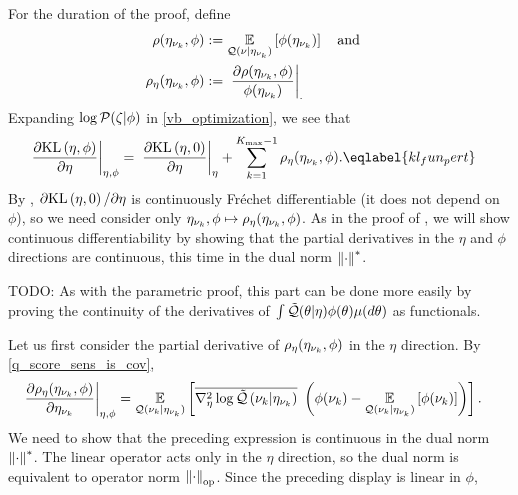 For the duration of the proof, define
%
\begin{align*}
%
\rho(\etanuk, \phi) :={}&
    \expect{\q(\nu \vert \etanuk)}{\phi(\etanuk)}
\mathand\\
\rho_\eta(\etanuk, \phi) :={}&
    \fracat{\partial \rho(\etanuk, \phi)}{\phi(\etanuk)}.
%
\end{align*}
%
Expanding $\log \mathcal{P}(\zeta \vert \phi)$ in \eqref{vb_optimization}, we see that
%
\begin{align}
\fracat{\partial \KL{\eta, \phi}}{\partial \eta}{\eta, \phi}
 ={}&
    \fracat{\partial \KL{\eta, \phiz}}{\partial \eta}{\eta} +
    \sumkm \rho_\eta(\etanuk, \phi). \eqlabel{kl_fun_pert}
%
\end{align}
%
By , $\partial \mathrm{KL}\left(\eta, 0\right) / \partial \eta$ is
continuously Fr{\'e}chet differentiable (it does not depend on $\phi$), so we
need consider only $\eta_{\nu_{k}}, \phi \mapsto \rho_\eta(\eta_{\nu_{k}}, \phi)$.  As
in the proof of , we will show continuous differentiability
by showing that the partial derivatives in the $\eta$ and $\phi$ directions
are continuous, this time in the dual norm $\left\Vert\cdot\right\Vert^*$.

TODO: As with the parametric proof, this part can be done more easily by proving
the continuity of the derivatives of $\int \tilde{\mathcal{Q}}(\theta \vert \eta) \phi(\theta)
\mu(d\theta)$ as functionals.

Let us first consider the partial derivative of $\rho_\eta(\eta_{\nu_{k}}, \phi)$ in
the $\eta$ direction. By  \eqref{q_score_sens_is_cov},
%
\begin{align*}
%
\fracat{\partial \rho_\eta(\etanuk, \phi)}{\partial \etanuk}{\eta, \phi} ={}&
\expect{\q(\nuk \vert \etanuk)}{
   \lqhessbar{\nuk \vert \etanuk}
       \left(
        \phi(\nuk) - \expect{\q(\nuk \vert \etanuk)}{\phi(\nuk)}
       \right)
       }.
%
\end{align*}
%
We need to show that the preceding expression is continuous in the dual norm
$\left\Vert\cdot\right\Vert^*$.  The linear operator acts only in the $\eta$ direction, so
the dual norm is equivalent to operator norm $\left\Vert\cdot\right\Vert_{\mathrm{op}}$.  Since
the preceding display is linear in $\phi$,

